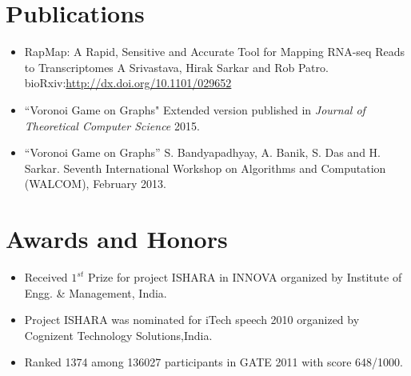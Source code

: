 \documentclass{res}
\begin{document}
\begin{resume}
\vspace{-0.2in}
\section{Publications}
\begin{itemize}[leftmargin=-2.1em]
\item{\color{blue}RapMap: A Rapid, Sensitive and Accurate Tool for Mapping RNA-seq Reads to Transcriptomes} A Srivastava, Hirak Sarkar and Rob Patro.  bioRxiv:\url{http://dx.doi.org/10.1101/029652}
\item {\color{blue}``Voronoi Game on Graphs"} Extended version published in {\it Journal of Theoretical Computer Science} 2015.
\item {\color{blue}``Voronoi Game on Graphs''} S. Bandyapadhyay, A. Banik, S. Das and H. Sarkar. Seventh International Workshop on Algorithms and Computation (WALCOM), February 2013.
\end{itemize}



 \vspace{-0.1in}
\section{Awards and Honors}
   \begin{itemize}[leftmargin=-2.1em]
   \item Received {\color{blue} $1^{st}$ Prize} for project ISHARA in INNOVA  organized by Institute of Engg. \& Management, India.

   \item Project ISHARA was nominated for iTech speech 2010  organized by Cognizent Technology Solutions,India.

   \item Ranked 1374 among 136027 participants in GATE 2011 with score 648/1000.   

   \end{itemize}
 \vspace{-0.15in}
%
%         
 
\end{resume}
\end{document}
